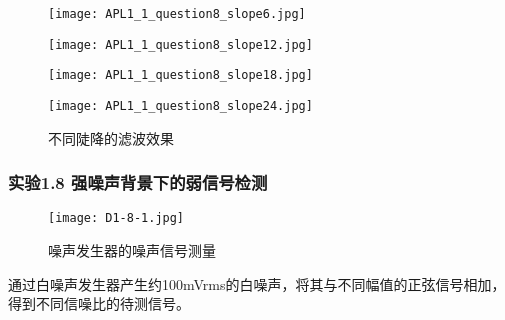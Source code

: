 \documentclass[dvipsnames, svgnames,a4paper,11pt]{article}
\begin{document}
	\begin{figure}[htbp]
		\centering
		\begin{minipage}[b]{0.45\textwidth}
			\centering
			\texttt{[image: APL1\_1\_question8\_slope6.jpg]} %
			\caption{$Slope = 6 \mathrm{dB/oct}$}
			\label{fig:D1-4-1-1}
		\end{minipage}
		\hspace{0.05\textwidth} %
		\begin{minipage}[b]{0.45\textwidth}
			\centering
			\texttt{[image: APL1\_1\_question8\_slope12.jpg]} %
			\caption{$Slope = 12 \mathrm{dB/oct}$}
			\label{fig:D1-4-1-2}
		\end{minipage}
		
		\vspace{0.01\textwidth} %
	
		\begin{minipage}[b]{0.45\textwidth}
			\centering
			\texttt{[image: APL1\_1\_question8\_slope18.jpg]} %
			\caption{$Slope = 18 \mathrm{dB/oct}$}
			\label{fig:D1-4-1-3}
		\end{minipage}
		\hspace{0.05\textwidth} %
		\begin{minipage}[b]{0.45\textwidth}
			\centering
			\texttt{[image: APL1\_1\_question8\_slope24.jpg]} %
			\caption{$Slope = 24 \mathrm{dB/oct}$}
			\label{fig:D1-4-1-4}
		\end{minipage}
		\caption*{不同陡降的滤波效果}
		\label{fig:D1-4-1}
	\end{figure}









	\clearpage
	\subsubsection*{实验1.8 \quad 强噪声背景下的弱信号检测}

	\begin{wrapfigure}{l}{0.5\textwidth}
		\centering
		\texttt{[image: D1-8-1.jpg]}
		\caption{噪声发生器的噪声信号测量}
		\label{fig:D1-8-1}
	\end{wrapfigure}

	通过白噪声发生器产生约100mVrms的白噪声，将其与不同幅值的正弦信号相加，得到不同信噪比的待测信号。
	
\end{document}
